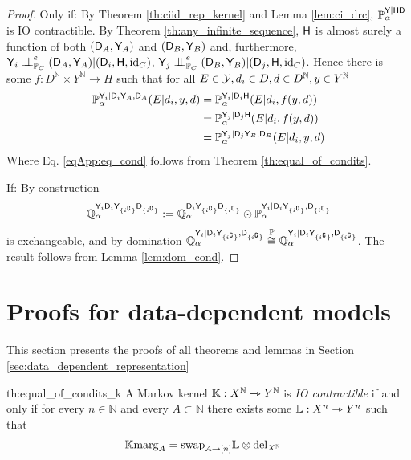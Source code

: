 \begin{proof}
Only if: By Theorem \ref{th:ciid_rep_kernel} and Lemma \ref{lem:ci_drc}, $\mathbb{P}_\alpha^{\mathsf{Y}|\mathsf{HD}}$ is IO contractible. By Theorem \ref{th:any_infinite_sequence}, $\mathsf{H}$ is almost surely a function of both $(\mathsf{D}_A,\mathsf{Y}_A)$ and $(\mathsf{D}_B,\mathsf{Y}_B)$ and, furthermore, $\RV{Y}_i\CI_{\prob{P}_C}^e (\RV{D}_A,\RV{Y}_A)|(\RV{D}_i,\RV{H},\text{id}_C)$, $\RV{Y}_j\CI_{\prob{P}_C}^e (\RV{D}_B,\RV{Y}_B)|(\RV{D}_j,\RV{H},\text{id}_C)$. Hence there is some $f:D^{\mathbb{N}}\times Y^{\mathbb{N}}\to H$ such that for all $E\in \mathcal{Y}, d_i\in D, d\in D^{\mathbb{N}}, y\in Y^{\mathbb{N}}$
\begin{align}
    \mathbb{P}_\alpha^{\mathsf{Y}_i|\mathsf{D}_i\mathsf{Y}_A,\mathsf{D}_A}(E|d_i,y,d) &= \mathbb{P}_\alpha^{\mathsf{Y}_i|\mathsf{D}_i\mathsf{H}}(E|d_i,f(y,d))\\
     &= \mathbb{P}_\alpha^{\mathsf{Y}_j|\mathsf{D}_j\mathsf{H}}(E|d_i,f(y,d))\label{eqApp:eq_cond}\\
     &= \mathbb{P}_\alpha^{\mathsf{Y}_j|\mathsf{D}_j\mathsf{Y}_B,\mathsf{D}_B}(E|d_i,y,d)
\end{align}
Where Eq. \eqref{eqApp:eq_cond} follows from Theorem \ref{th:equal_of_condits}.

If:
By construction
\begin{align}
    \mathbb{Q}_\alpha^{\mathsf{Y}_i\mathsf{D}_i\mathsf{Y}_{\{i^{\complement}\}}\mathsf{D}_{\{i^{\complement}\}}}:=\mathbb{Q}_\alpha^{\mathsf{D}_i\mathsf{Y}_{\{i^{\complement}\}}\mathsf{D}_{\{i^{\complement}\}}}\odot \mathbb{P}_\alpha^{\mathsf{Y}_i|\mathsf{D}_i\mathsf{Y}_{\{i^{\complement}\}},\mathsf{D}_{\{i^{\complement}\}}}
\end{align}
is exchangeable, and by domination $\mathbb{Q}_\alpha^{\mathsf{Y}_i|\mathsf{D}_i\mathsf{Y}_{\{i^{\complement}\}},\mathsf{D}_{\{i^{\complement}\}}}\overset{\mathbb{P}}{\cong}\mathbb{Q}_\alpha^{\mathsf{Y}_i|\mathsf{D}_i\mathsf{Y}_{\{i^{\complement}\}},\mathsf{D}_{\{i^{\complement}\}}}$. The result follows from Lemma \ref{lem:dom_cond}.
\end{proof}

\section{Proofs for data-dependent models}\label{sec:data_dep_proofs}

This section presents the proofs of all theorems and lemmas in Section \ref{sec:data_dependent_representation}

\begin{reptheorem}{th:equal_of_condits_k}
A Markov kernel $\mathbb{K}:X^{\mathbb{N}}\rightarrowtriangle Y^{\mathbb{N}}$ is \emph{IO contractible} if and only if for every $n\in \mathbb{N}$ and every $A\subset\mathbb{N}$ there exists some $\mathbb{L}:X^n\rightarrowtriangle Y^n$ such that
\begin{align}
    \mathbb{K} \text{marg}_A &= \text{swap}_{A\rightarrow [n]} \mathbb{L}\otimes \text{del}_{X^{\mathbb{N}}}
\end{align}
\end{reptheorem}

